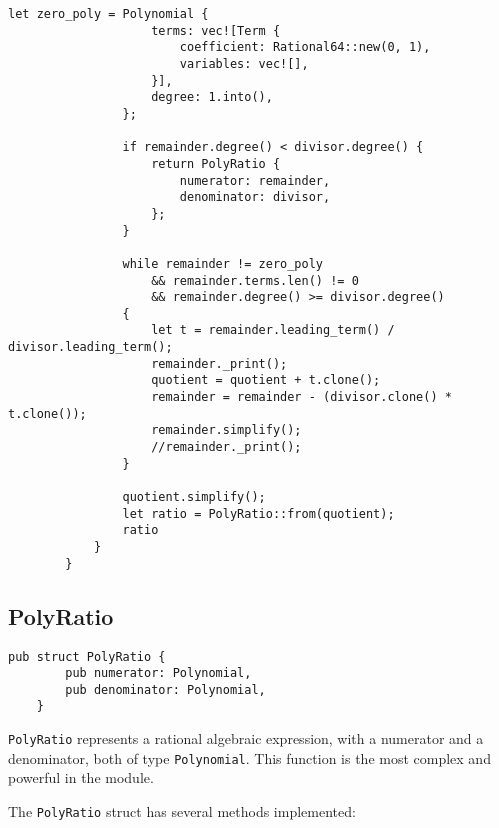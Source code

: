 {\begin{lstlisting}[caption={The implementation of the division operation for the \texttt{Polynomial} struct}, label={lst:polynomial-div}]
                let zero_poly = Polynomial {
                    terms: vec![Term {
                        coefficient: Rational64::new(0, 1),
                        variables: vec![],
                    }],
                    degree: 1.into(),
                };
        
                if remainder.degree() < divisor.degree() {
                    return PolyRatio {
                        numerator: remainder,
                        denominator: divisor,
                    };
                }
        
                while remainder != zero_poly
                    && remainder.terms.len() != 0
                    && remainder.degree() >= divisor.degree()
                {
                    let t = remainder.leading_term() / divisor.leading_term();
                    remainder._print();
                    quotient = quotient + t.clone();
                    remainder = remainder - (divisor.clone() * t.clone());
                    remainder.simplify();
                    //remainder._print();
                }
        
                quotient.simplify();
                let ratio = PolyRatio::from(quotient);
                ratio
            }
        }
    \end{lstlisting}        
}

\subsection{PolyRatio}\label{subsec:polyratio}

\begin{lstlisting}[caption={The \texttt{PolyRatio} struct}, label={lst:polyratio}]
    pub struct PolyRatio {
        pub numerator: Polynomial,
        pub denominator: Polynomial,
    }
\end{lstlisting}

\verb|PolyRatio| represents a rational algebraic expression, with a numerator and a denominator, both of type \verb|Polynomial|. This function is the most complex and powerful in the module.

The \verb|PolyRatio| struct has several methods implemented:

